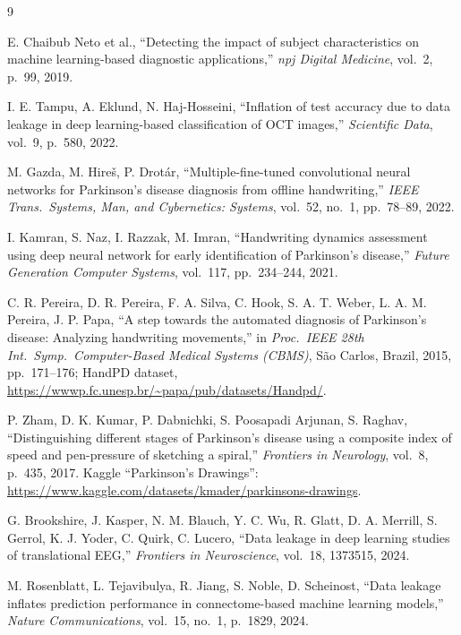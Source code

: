 \documentclass[3p,final,10pt]{elsarticle}
\begin{document}
\begin{thebibliography}{9}

E. Chaibub Neto et al., ``Detecting the impact of subject characteristics
on machine learning-based diagnostic applications,'' \emph{npj Digital
Medicine}, vol.\ 2, p.\ 99, 2019.

I. E. Tampu, A. Eklund, N. Haj-Hosseini, ``Inflation of test accuracy due
to data leakage in deep learning-based classification of OCT images,''
\emph{Scientific Data}, vol.\ 9, p.\ 580, 2022.

M. Gazda, M. Hire\v{s}, P. Drot\'{a}r, ``Multiple-fine-tuned convolutional
neural networks for Parkinson's disease diagnosis from offline
handwriting,'' \emph{IEEE Trans.\ Systems, Man, and Cybernetics: Systems},
vol.\ 52, no.\ 1, pp.\ 78--89, 2022.

I. Kamran, S. Naz, I. Razzak, M. Imran, ``Handwriting dynamics assessment
using deep neural network for early identification of Parkinson's
disease,'' \emph{Future Generation Computer Systems}, vol.\ 117,
pp.\ 234--244, 2021.

C. R. Pereira, D. R. Pereira, F. A. Silva, C. Hook, S. A. T. Weber,
L. A. M. Pereira, J. P. Papa, ``A step towards the automated diagnosis of
Parkinson's disease: Analyzing handwriting movements,'' in \emph{Proc.\
IEEE 28th Int.\ Symp.\ Computer-Based Medical Systems (CBMS)}, S\~{a}o
Carlos, Brazil, 2015, pp.\ 171--176; HandPD dataset,
\url{https://wwwp.fc.unesp.br/~papa/pub/datasets/Handpd/}.

P. Zham, D. K. Kumar, P. Dabnichki, S. Poosapadi Arjunan, S. Raghav,
``Distinguishing different stages of Parkinson's disease using a
composite index of speed and pen-pressure of sketching a spiral,''
\emph{Frontiers in Neurology}, vol.\ 8, p.\ 435, 2017. Kaggle
``Parkinson's Drawings'': \url{https://www.kaggle.com/datasets/kmader/parkinsons-drawings}.

G. Brookshire, J. Kasper, N. M. Blauch, Y. C. Wu, R. Glatt, D. A. Merrill,
S. Gerrol, K. J. Yoder, C. Quirk, C. Lucero, ``Data leakage in deep
learning studies of translational EEG,'' \emph{Frontiers in Neuroscience},
vol.\ 18, 1373515, 2024.

M. Rosenblatt, L. Tejavibulya, R. Jiang, S. Noble, D. Scheinost, ``Data
leakage inflates prediction performance in connectome-based machine
learning models,'' \emph{Nature Communications}, vol.\ 15, no.\ 1,
p.\ 1829, 2024.


\end{thebibliography}
\end{document}
